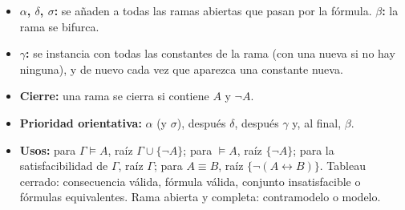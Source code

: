 \begin{itemize}
    \item \textbf{$\alpha$, $\delta$, $\sigma$:} se añaden a todas las ramas abiertas que pasan por la fórmula. \textbf{$\beta$:} la rama se bifurca.
    \item \textbf{$\gamma$:} se instancia con todas las constantes de la rama (con una nueva si no hay ninguna), y de nuevo cada vez que aparezca una constante nueva.
    \item \textbf{Cierre:} una rama se cierra si contiene $A$ y $\neg A$.
    \item \textbf{Prioridad orientativa:} $\alpha$ (y $\sigma$), después $\delta$, después $\gamma$ y, al final, $\beta$.
    \item \textbf{Usos:} para $\Gamma \models A$, raíz $\Gamma \cup \{\neg A\}$; para $\models A$, raíz $\{\neg A\}$; para la satisfacibilidad de $\Gamma$, raíz $\Gamma$; para $A \equiv B$, raíz $\{\neg(A \leftrightarrow B)\}$. Tableau cerrado: consecuencia válida, fórmula válida, conjunto insatisfacible o fórmulas equivalentes. Rama abierta y completa: contramodelo o modelo.
\end{itemize}

